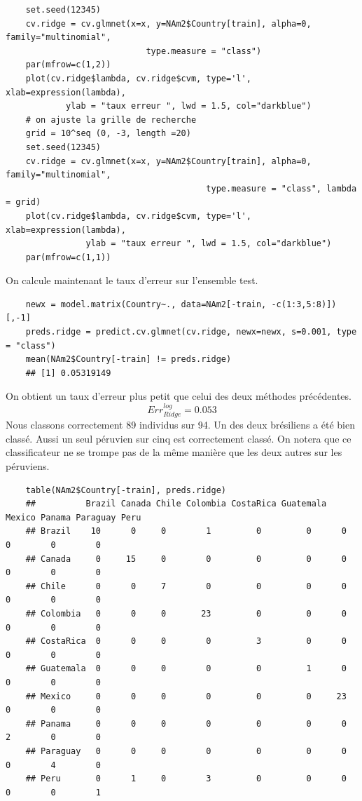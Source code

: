 \documentclass[12pt,a4paper]{article}
\begin{document}
\begin{lstlisting}
	set.seed(12345)
	cv.ridge = cv.glmnet(x=x, y=NAm2$Country[train], alpha=0, family="multinomial",
							type.measure = "class")
	par(mfrow=c(1,2))
	plot(cv.ridge$lambda, cv.ridge$cvm, type='l', xlab=expression(lambda),
			ylab = "taux erreur ", lwd = 1.5, col="darkblue")
	# on ajuste la grille de recherche		
	grid = 10^seq (0, -3, length =20)
	set.seed(12345)
	cv.ridge = cv.glmnet(x=x, y=NAm2$Country[train], alpha=0, family="multinomial",
										type.measure = "class", lambda = grid)
	plot(cv.ridge$lambda, cv.ridge$cvm, type='l', xlab=expression(lambda),
				ylab = "taux erreur ", lwd = 1.5, col="darkblue")
	par(mfrow=c(1,1))
\end{lstlisting}
On calcule maintenant le taux d'erreur sur l'ensemble test. \vspace{2mm}
\begin{lstlisting}
	newx = model.matrix(Country~., data=NAm2[-train, -c(1:3,5:8)])[,-1]
	preds.ridge = predict.cv.glmnet(cv.ridge, newx=newx, s=0.001, type = "class")
	mean(NAm2$Country[-train] != preds.ridge)
	## [1] 0.05319149
\end{lstlisting}
On obtient un taux d'erreur plus petit que celui des deux méthodes précédentes.\vspace{-3mm} \[Err_{Ridge}^{log} = 0.053\]
Nous classons correctement 89 individus sur 94. Un des deux brésiliens a été bien classé. Aussi un seul péruvien sur cinq est correctement classé. On notera que ce classificateur ne se trompe pas de la même manière que les deux autres sur les péruviens.
\begin{lstlisting}
	table(NAm2$Country[-train], preds.ridge)
	## 			Brazil Canada Chile Colombia CostaRica Guatemala Mexico Panama Paraguay Peru
	## Brazil    10      0     0        1         0         0      0      0        0        0
	## Canada     0     15     0        0         0         0      0      0        0        0
	## Chile      0      0     7        0         0         0      0      0        0        0
	## Colombia   0      0     0       23         0         0      0      0        0        0
	## CostaRica  0      0     0        0         3         0      0      0        0        0
	## Guatemala  0      0     0        0         0         1      0      0        0        0
	## Mexico     0      0     0        0         0         0     23      0        0        0
	## Panama     0      0     0        0         0         0      0      2        0        0
	## Paraguay   0      0     0        0         0         0      0      0        4        0
	## Peru       0      1     0        3         0         0      0      0        0        1
\end{lstlisting}
\end{document}
